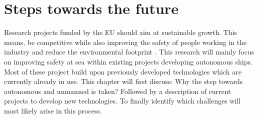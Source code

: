 \chapter{Steps towards the future}
\label{ch:future}
Research projects funded by the EU should aim at sustainable growth. This means, be competitive while also improving the safety of people working in the industry and reduce the environmental footprint \cite{Eriksen2017} \cite{EU2017}.
This research will mainly focus on improving safety at sea within existing projects developing autonomous ships. Most of these project build upon previously developed technologies which are currently already in use. This chapter will first discuss: Why the step towards autonomous and unmanned is taken? Followed by a description of current projects to develop new technologies. To finally identify which challenges will most likely arise in this process.

